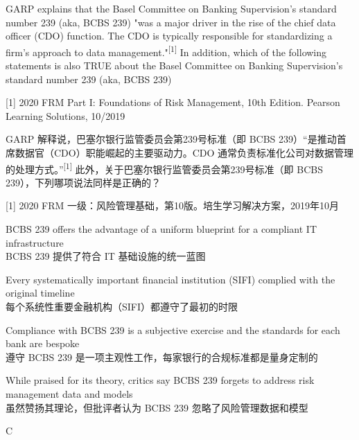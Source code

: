 \documentclass{article}
\newcounter{question} %
\begin{document}
\begin{question}
    GARP explains that the Basel Committee on Banking Supervision's standard number 239 (aka, BCBS 239) "was a major driver in the rise of the chief data officer (CDO) function. The CDO is typically responsible for standardizing a firm's approach to data management."\textsuperscript{[1]} In addition, which of the following statements is also TRUE about the Basel Committee on Banking Supervision's standard number 239 (aka, BCBS 239)

    [1] 2020 FRM Part I: Foundations of Risk Management, 10th Edition. Pearson Learning Solutions, 10/2019

    GARP 解释说，巴塞尔银行监管委员会第239号标准（即 BCBS 239）“是推动首席数据官（CDO）职能崛起的主要驱动力。CDO 通常负责标准化公司对数据管理的处理方式。”\textsuperscript{[1]} 此外，关于巴塞尔银行监管委员会第239号标准（即 BCBS 239），下列哪项说法同样是正确的？

    [1] 2020 FRM 一级：风险管理基础，第10版。培生学习解决方案，2019年10月
    
\end{question}

\begin{choices}
    \item BCBS 239 offers the advantage of a uniform blueprint for a compliant IT infrastructure
    \\BCBS 239 提供了符合 IT 基础设施的统一蓝图
    \item Every systematically important financial institution (SIFI) complied with the original timeline
    \\每个系统性重要金融机构（SIFI）都遵守了最初的时限
    \item Compliance with BCBS 239 is a subjective exercise and the standards for each bank are bespoke
    \\遵守 BCBS 239 是一项主观性工作，每家银行的合规标准都是量身定制的
    \item While praised for its theory, critics say BCBS 239 forgets to address risk management data and models
    \\虽然赞扬其理论，但批评者认为 BCBS 239 忽略了风险管理数据和模型
\end{choices}

\begin{correctanswer}
    C
\end{correctanswer}
\end{document}
